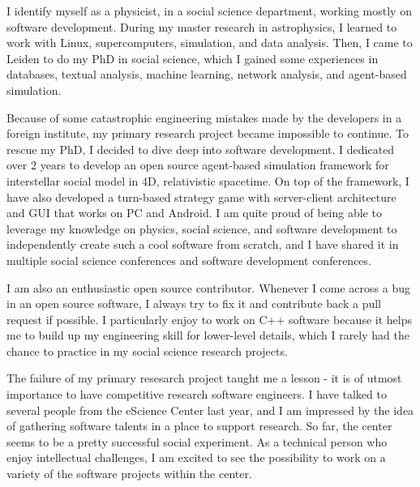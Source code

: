 \documentclass[11pt, a4paper]{awesome-cv}
\begin{document}
\makecvheader[R]

\makecvfooter
  {}%
  {}%
  {}

\makelettertitle

\begin{cvletter}

I identify myself as a physicist, in a social science department, working mostly on software development.
During my master research in astrophysics,
I learned to work with Linux, supercomputers, simulation, and data analysis.
Then, I came to Leiden to do my PhD in social science,
which I gained some experiences in databases, textual analysis, machine learning, network analysis,
and agent-based simulation.

Because of some catastrophic engineering mistakes made by the developers in a foreign institute,
my primary research project became impossible to continue.
To rescue my PhD, I decided to dive deep into software development.
I dedicated over 2 years to develop an open source agent-based simulation framework for interstellar social model
in 4D, relativistic spacetime.
On top of the framework, I have also developed a turn-based strategy game with server-client architecture
and GUI that works on PC and Android.
I am quite proud of being able to leverage my knowledge on physics, social science, and software development
to independently create such a cool software from scratch, and I have shared it in multiple social science conferences
and software development conferences.

I am also an enthusiastic open source contributor. 
Whenever I come across a bug in an open source software,
I always try to fix it and contribute back a pull request if possible.
I particularly enjoy to work on C++ software because it helps me
to build up my engineering skill for lower-level details,
which I rarely had the chance to practice in my social science research projects.

The failure of my primary resesarch project taught me a lesson -
it is of utmost importance to have competitive research software engineers.
I have talked to several people from the eScience Center last year,
and I am impressed by the idea of gathering software talents in a place to support research.
So far, the center seems to be a pretty successful social experiment.
As a technical person who enjoy intellectual challenges,
I am excited to see the possibility to work on a variety of the software projects within the center.


\end{cvletter}
\end{document}
